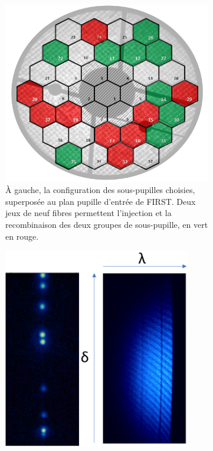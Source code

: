 \begin{figure}[ht!]
    \centering
    \begin{subfigure}[t]{0.49\textwidth}
        \centering
        \includegraphics[width=\textwidth]{Figure_Chap1/Vievard2020_Figure5.png}
        \caption{À gauche, la configuration des sous-pupilles choisies, superposée au plan pupille d'entrée de FIRST. Deux jeux de neuf fibres permettent l'injection et la recombinaison des deux groupes de sous-pupille, en vert en rouge.}
        \label{fig:FIRSTv1PupilMaskingSubaruA}
    \end{subfigure}\hspace{0.01\textwidth}
    \begin{subfigure}[t]{0.49\textwidth}
        \centering
        \includegraphics[width=0.9\textwidth]{Figure_Chap1/Vievard2020_Figure4.png}

\end{subfigure}
\end{figure}
